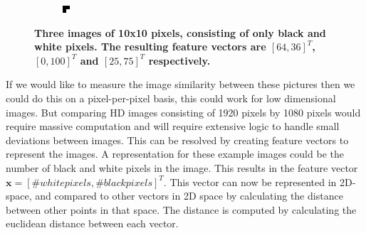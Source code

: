 \documentclass{article}
\begin{document}
\begin{figure}[H]
\begin{subfigure}[b]{0.2\textwidth}
	\end{subfigure}
	\begin{subfigure}[b]{0.2\textwidth}
		\includegraphics[width=\textwidth]{images/mostlyblack.png}
	\end{subfigure}
	\caption{\textbf{Three images of 10x10 pixels, consisting of only black and white pixels. The resulting feature vectors are $[64,36]^T$, $[0, 100]^T$ and $[25,75]^T$ respectively.}}
	\label{featurevectorimages}
\end{figure}

If we would like to measure the image similarity between these pictures then we could do this on a pixel-per-pixel basis, this could work for low dimensional images. But comparing HD images consisting of 1920 pixels by 1080 pixels would require massive computation and will require extensive logic to handle small deviations between images. This can be resolved by creating feature vectors to represent the images. A representation for these example images could be the number of black and white pixels in the image. This results in the feature vector $\textbf{x} = [\# white pixels, \# black pixels]^T$. This vector can now be represented in 2D-space, and compared to other vectors in 2D space by calculating the distance between other points in that space. The distance is computed by calculating the euclidean distance between each vector.
\end{document}
